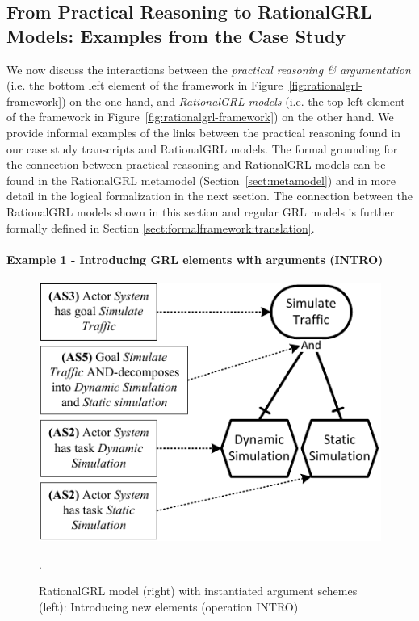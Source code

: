 \subsection{From Practical Reasoning to RationalGRL Models: Examples from the Case Study}
\label{sect:overview:examples}

We now discuss the interactions between the \emph{practical reasoning \& argumentation} (i.e. the bottom left element of the framework in Figure~\ref{fig:rationalgrl-framework}) on the one hand, and \emph{RationalGRL models} (i.e. the top left element of the framework in Figure~\ref{fig:rationalgrl-framework}) on the other hand. We provide informal examples of the links between the practical reasoning found in our case study transcripts and RationalGRL models. The formal grounding for the connection between practical reasoning and RationalGRL models can be found in the RationalGRL metamodel (Section~\ref{sect:metamodel}) and in more detail in the logical formalization in the next section. The connection between the RationalGRL models shown in this section and regular GRL models is further formally defined in Section \ref{sect:formalframework:translation}. 

\paragraph{Example 1 - Introducing GRL elements with arguments (\textsf{INTRO)}}

\begin{figure}[t]
\centering
\includegraphics[width=\columnwidth]{img/fig_example_AS.pdf}
\caption{RationalGRL model (right) with instantiated argument schemes (left): Introducing new elements (operation \textsf{INTRO)}}. 
\label{fig:example_AS}
\end{figure}

